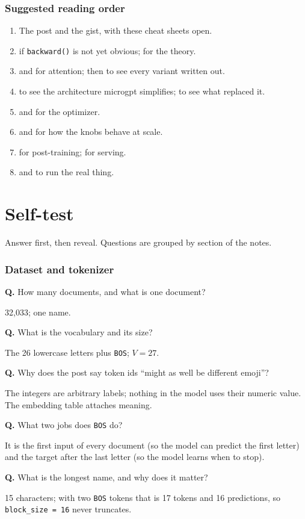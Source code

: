 \documentclass[10pt,letterpaper]{article}
\newcommand{\code}[1]{\lstinline[basicstyle=\ttfamily\small]|#1|}
\newcommand{\BOS}{\texttt{BOS}}
\newcounter{q}
\newcommand{\Q}[2]{\stepcounter{q}\par\noindent\textbf{Q\theq.} #1\par\noindent{\color{accent2}\textit{A.}} #2\par\medskip}
\begin{document}
\section{Suggested reading order}

\begin{enumerate}
  \item The post \parencite{karpathy2026microgpt} and the gist, with these cheat sheets open.
  \item \textcite{karpathy2022microgradvideo} if \code{backward()} is not yet obvious; \textcite{baydin2018autodiff} for the theory.
  \item \textcite{vaswani2017attention} and \textcite{alammar2018illustrated} for attention; then \textcite{phuong2022formal} to see every variant written out.
  \item \textcite{radford2019gpt2} to see the architecture microgpt simplifies; \textcite{touvron2023llama} to see what replaced it.
  \item \textcite{kingma2015adam} and \textcite{loshchilov2019adamw} for the optimizer.
  \item \textcite{kaplan2020scaling} and \textcite{hoffmann2022chinchilla} for how the knobs behave at scale.
  \item \textcite{ouyang2022instructgpt} for post-training; \textcite{kwon2023vllm} for serving.
  \item \textcite{karpathy2022nanogpt} and \textcite{karpathy2025nanochat} to run the real thing.
\end{enumerate}

\clearpage
\part{Self-test}
\label{part:test}

Answer first, then reveal. Questions are grouped by section of the notes.

\section{Dataset and tokenizer}
\Q{How many documents, and what is one document?}{32{,}033; one name.}
\Q{What is the vocabulary and its size?}{The 26 lowercase letters plus \BOS; $V=27$.}
\Q{Why does the post say token ids ``might as well be different emoji''?}{The integers are arbitrary labels; nothing in the model uses their numeric value. The embedding table attaches meaning.}
\Q{What two jobs does \BOS{} do?}{It is the first input of every document (so the model can predict the first letter) and the target after the last letter (so the model learns when to stop).}
\Q{What is the longest name, and why does it matter?}{15 characters; with two \BOS{} tokens that is 17 tokens and 16 predictions, so \code{block_size = 16} never truncates.}
\end{document}
